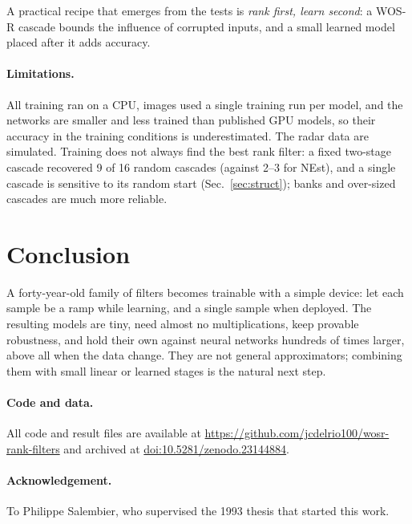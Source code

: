 \documentclass[11pt,a4paper]{article}
\newcommand{\ghrepo}{\url{https://github.com/jcdelrio100/wosr-rank-filters}}
\newcommand{\swdoi}{10.5281/zenodo.23144884}
\begin{document}
A practical recipe that emerges from the tests is \emph{rank first, learn second}: a WOS-R cascade bounds the influence
of corrupted inputs, and a small learned model placed after it adds accuracy.

\paragraph{Limitations.} All training ran on a CPU, images used a single training run per model, and the networks are
smaller and less trained than published GPU models, so their accuracy in the training conditions is underestimated.
The radar data are simulated. Training does not always find the best rank filter: a fixed two-stage cascade recovered
9 of 16 random cascades (against 2--3 for NEst), and a single cascade is sensitive to its random start
(Sec.~\ref{sec:struct}); banks and over-sized cascades are much more reliable.

\section{Conclusion}
A forty-year-old family of filters becomes trainable with a simple device: let each sample be a ramp while learning,
and a single sample when deployed. The resulting models are tiny, need almost no multiplications, keep provable
robustness, and hold their own against neural networks hundreds of times larger, above all when the data change. They
are not general approximators; combining them with small linear or learned stages is the natural next step.

{\sloppy \paragraph{Code and data.} All code and result files are available at
\ghrepo{} and archived at \href{https://doi.org/\swdoi}{doi:\swdoi}.\par}

\paragraph{Acknowledgement.} To Philippe Salembier, who supervised the 1993 thesis that started this work.




\clearpage
\appendix
\end{document}
